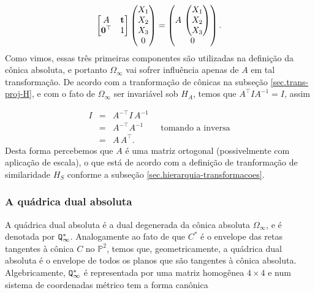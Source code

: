 \begin{equation*}
\begin{bmatrix}
A&{\bf t}\\
{\bf 0}^\top&1
\end{bmatrix}
\begin{pmatrix}
X_1\\
X_2\\
X_3\\
0
\end{pmatrix}
=
\begin{pmatrix}
A\,
\begin{pmatrix}
X_1\\
X_2\\
X_3
\end{pmatrix}\\
0
\end{pmatrix}.
\end{equation*}
Como vimos, essas três primeiras componentes são utilizadas na definição da cônica absoluta, e portanto $\Omega_\infty$ vai sofrer influência apenas de $A$ em tal transformação. 
De acordo com a tranformação de cônicas na subseção \ref{sec.trans-proj-H}, e com o fato de $\Omega_\infty$ ser invariável sob 
$H_A$, temos que $A^\top I A^{-1}=I$, assim

\begin{equation*}
\begin{array}{rcl}
I&=&A^{-\top}I\,A^{-1}\\
&=&A^{-\top}A^{-1}\qquad\text{tomando a inversa}\\
&=&A\,A^\top.
\end{array}
\end{equation*}
Desta forma percebemos que $A$ é uma matriz ortogonal (possivelmente com aplicação de escala), o que está de acordo com a definição de tranformação de similaridade $H_S$ conforme a subseção \ref{sec.hierarquia-transformacoes}.

\subsubsection{A quádrica dual absoluta}\label{sec.quadrica-dual-abs}
A quádrica dual absoluta é a dual degenerada da cônica absoluta $\Omega_\infty$, e é denotada por 
${\tt Q}^*_\infty$. Analogamente ao fato de que $C^*$ é o envelope das retas tangentes à cônica $C$ no ${\mathbb{P}}^2$, temos que, geometricamente, a quádrica dual absoluta é o envelope de todos os planos que são tangentes à cônica absoluta. Algebricamente, 
${\tt Q}^*_\infty$ é representada por uma matriz homogênea $4\times4$ e num sistema de coordenadas métrico tem a forma canônica

